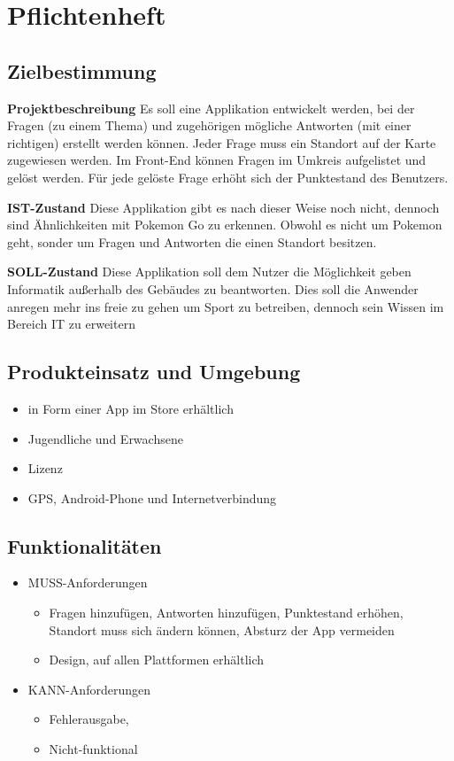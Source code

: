 \section{Pflichtenheft}
\subsection{Zielbestimmung}

\textbf {Projektbeschreibung}
 Es soll eine Applikation entwickelt werden, bei der Fragen (zu einem Thema) und zugehörigen mögliche Antworten (mit einer richtigen) erstellt werden können. Jeder Frage muss ein Standort auf der Karte zugewiesen werden.
Im Front-End können Fragen im Umkreis aufgelistet und gelöst werden. Für jede gelöste Frage erhöht sich der Punktestand des Benutzers.

\textbf {IST-Zustand}
Diese Applikation gibt es nach dieser Weise noch nicht, dennoch sind Ähnlichkeiten mit Pokemon Go zu erkennen. Obwohl es nicht um Pokemon geht, sonder um Fragen und Antworten die einen Standort besitzen.

\textbf {SOLL-Zustand}
Diese Applikation soll dem Nutzer die Möglichkeit geben Informatik außerhalb des Gebäudes zu beantworten. Dies soll die Anwender anregen mehr ins freie zu gehen um Sport zu betreiben, dennoch sein Wissen im Bereich IT zu erweitern


\subsection{Produkteinsatz und Umgebung}
\begin{itemize}
	\item in Form einer App im Store erhältlich
	\item Jugendliche und Erwachsene
	\item Lizenz
	\item GPS, Android-Phone und Internetverbindung
\end{itemize}
\subsection{Funktionalitäten}
\begin{itemize}
	\item MUSS-Anforderungen
	\begin{itemize}
		\item Fragen hinzufügen, Antworten hinzufügen, Punktestand erhöhen, Standort muss sich ändern können, Absturz der App vermeiden
		\item Design, auf allen Plattformen erhältlich
	\end{itemize}
	\item KANN-Anforderungen
	\begin{itemize}
		\item Fehlerausgabe, 
		\item Nicht-funktional
	\end{itemize}
\end{itemize}
